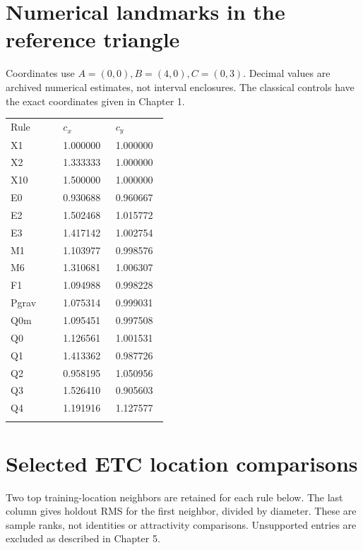 \documentclass[11pt,oneside,openany]{book}
\newcommand{\toprule}{\hline\noalign{\vskip4pt}}
\newcommand{\midrule}{\noalign{\vskip3pt}\hline\noalign{\vskip4pt}}
\newcommand{\bottomrule}{\noalign{\vskip3pt}\hline}
\begin{document}
\clearpage\section{Numerical landmarks in the reference triangle}

Coordinates use $A=(0,0),B=(4,0),C=(0,3)$. Decimal values are archived numerical estimates, not interval enclosures. The classical controls have the exact coordinates given in Chapter 1.

\begin{center}\small\begin{tabular}{p{0.3\linewidth}p{0.3\linewidth}p{0.3\linewidth}}\toprule
Rule & $c_x$ & $c_y$\\\midrule
X1 & 1.000000 & 1.000000\\
X2 & 1.333333 & 1.000000\\
X10 & 1.500000 & 1.000000\\
E0 & 0.930688 & 0.960667\\
E2 & 1.502468 & 1.015772\\
E3 & 1.417142 & 1.002754\\
M1 & 1.103977 & 0.998576\\
M6 & 1.310681 & 1.006307\\
F1 & 1.094988 & 0.998228\\
Pgrav & 1.075314 & 0.999031\\
$\mathrm{Q0m}$ & 1.095451 & 0.997508\\
$\mathrm{Q0}$ & 1.126561 & 1.001531\\
Q1 & 1.413362 & 0.987726\\
Q2 & 0.958195 & 1.050956\\
Q3 & 1.526410 & 0.905603\\
Q4 & 1.191916 & 1.127577\\\bottomrule\end{tabular}\end{center}

\clearpage\section{Selected ETC location comparisons}

Two top training-location neighbors are retained for each rule below. The last column gives holdout RMS for the first neighbor, divided by diameter. These are sample ranks, not identities or attractivity comparisons. Unsupported entries are excluded as described in Chapter 5.
\end{document}
